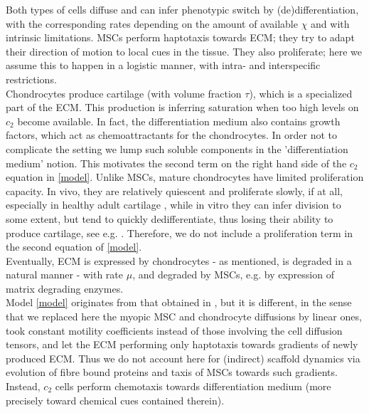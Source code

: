 \documentclass[a4paper,10pt]{article}
\theoremstyle{definition}
\begin{document}
\noindent
Both types of cells diffuse and can infer phenotypic switch by (de)differentiation, with the corresponding rates depending on the amount of available $\chi$ and with intrinsic limitations. MSCs perform haptotaxis towards ECM; they try to adapt their direction of motion to local cues in the tissue. They also proliferate; here we assume this to happen in a logistic manner, with intra- and interspecific restrictions. \\[-2ex]

\noindent
Chondrocytes produce cartilage (with volume fraction $\tau$), which is a specialized part of the ECM. This production is inferring saturation when too high levels on $c_2$ become available. In fact, the differentiation medium also contains growth factors, which act as chemoattractants for the chondrocytes. In order not to complicate the setting we lump such soluble components in the 'differentiation medium' notion. This motivates the second term on the right hand side of the $c_2$ equation in \eqref{model}. Unlike MSCs, mature chondrocytes have limited proliferation capacity. In vivo, they are relatively quiescent and proliferate slowly, if at all, especially in healthy adult cartilage \cite{Loeser2009}, while in vitro they can infer division to some extent, but tend to quickly dedifferentiate, thus losing their ability to produce cartilage, see e.g.  \cite{VONDERMARK1977}. Therefore, we do not include a proliferation term in the second equation of \eqref{model}.\\[-2ex]

\noindent
Eventually, ECM is expressed by chondrocytes - as mentioned, is degraded in a natural manner - with rate $\mu$, and degraded by MSCs, e.g. by expression of matrix degrading enzymes.\\[-2ex]

\noindent
Model \eqref{model} originates from that obtained in \cite{surulescu_AMM}, but it is different, in the sense that we replaced here the myopic MSC and chondrocyte diffusions by linear ones, took constant motility coefficients instead of those involving the cell diffusion tensors, and let the ECM performing only haptotaxis towards gradients of newly produced ECM. Thus we do not account here for (indirect) scaffold dynamics via evolution of fibre bound proteins and taxis of MSCs towards such gradients. Instead, $c_2$ cells perform chemotaxis towards differentiation medium (more precisely toward chemical cues contained therein). \\[-1ex]
\end{document}
